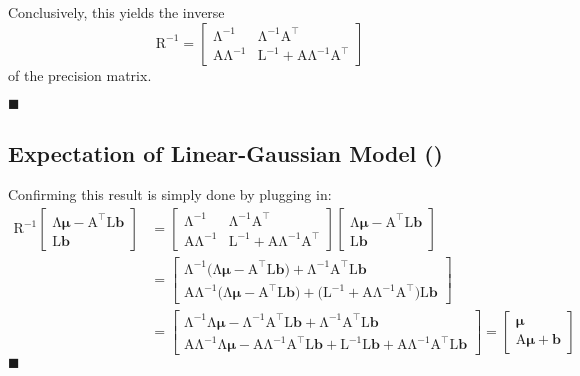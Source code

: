 \documentclass[11pt, a4paper]{scrartcl}
\newcommand{\transposed}{{\!\top\!}}
\renewcommand{\vec}[1]{\bm{#1}}
\newcommand{\mat}[1]{\bm{\mathrm{#1}}}
\newcommand{\eot}{\hfill\(\blacksquare\)}
\newcommand{\diffstar}{\texorpdfstring{\raisebox{-1pt}{\resizebox{!}{8pt}{\(\star\)}}}{*}}
\newcommand{\onestar}  {(\diffstar)}
\begin{document}
			Conclusively, this yields the inverse
			\begin{equation}
				\mat{R}^{-1} =
					\begin{bmatrix}
						\mat{\Lambda}^{-1}         & \mat{\Lambda}^{-1} \mat{A}^\transposed \\
						\mat{A} \mat{\Lambda}^{-1} & \mat{L}^{-1} + \mat{A} \mat{\Lambda}^{-1} \mat{A}^\transposed
					\end{bmatrix}
			\end{equation}
			of the precision matrix.

			\eot

		\subsection{Expectation of Linear-Gaussian Model  \onestar}
			Confirming this result is simply done by plugging in:
			\begin{align}
				\mat{R}^{-1}
					\begin{bmatrix}
						\mat{\Lambda} \vec{\mu} - \mat{A}^\transposed \mat{L} \vec{b} \\
						\mat{L} \vec{b}
					\end{bmatrix}
				&=
					\begin{bmatrix}
						\mat{\Lambda}^{-1}         & \mat{\Lambda}^{-1} \mat{A}^\transposed \\
						\mat{A} \mat{\Lambda}^{-1} & \mat{L}^{-1} + \mat{A} \mat{\Lambda}^{-1} \mat{A}^\transposed
					\end{bmatrix}
					\begin{bmatrix}
						\mat{\Lambda} \vec{\mu} - \mat{A}^\transposed \mat{L} \vec{b} \\
						\mat{L} \vec{b}
					\end{bmatrix} \\
				&=
					\begin{bmatrix}
						\mat{\Lambda}^{-1} \big( \mat{\Lambda} \vec{\mu} - \mat{A}^\transposed \mat{L} \vec{b} \big) + \mat{\Lambda}^{-1} \mat{A}^\transposed \mat{L} \vec{b} \\
						\mat{A} \mat{\Lambda}^{-1} \big( \mat{\Lambda} \vec{\mu} - \mat{A}^\transposed \mat{L} \vec{b} \big) + \big( \mat{L}^{-1} + \mat{A} \mat{\Lambda}^{-1} \mat{A}^\transposed \big) \mat{L} \vec{b}
					\end{bmatrix} \\
				&=
					\begin{bmatrix}
						\mat{\Lambda}^{-1} \mat{\Lambda} \vec{\mu} - \mat{\Lambda}^{-1} \mat{A}^\transposed \mat{L} \vec{b} + \mat{\Lambda}^{-1} \mat{A}^\transposed \mat{L} \vec{b} \\
						\mat{A} \mat{\Lambda}^{-1} \mat{\Lambda} \vec{\mu} - \mat{A} \mat{\Lambda}^{-1} \mat{A}^\transposed \mat{L} \vec{b} + \mat{L}^{-1} \mat{L} \vec{b} + \mat{A} \mat{\Lambda}^{-1} \mat{A}^\transposed \mat{L} \vec{b}
					\end{bmatrix}
				 =
					\begin{bmatrix}
						\vec{\mu} \\
						\mat{A} \vec{\mu} + \vec{b}
					\end{bmatrix}
			\end{align}
			\eot
\end{document}
